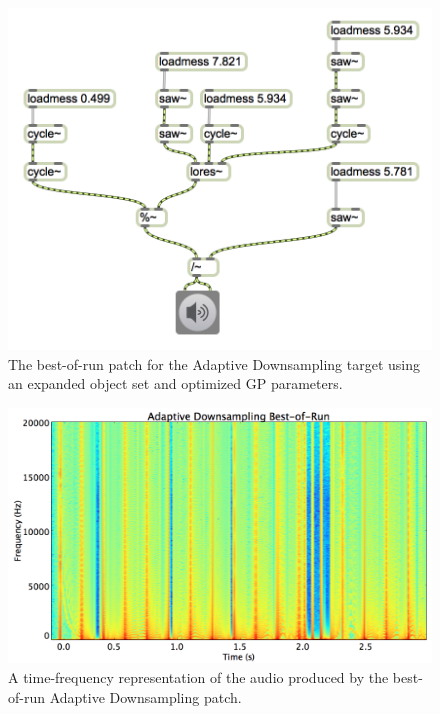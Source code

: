\documentclass[12pt]{report} 	%
\numberwithin{figure}{chapter}
\numberwithin{table}{chapter}
\numberwithin{equation}{chapter}
\begin{document}
\begin{flushleft}
\begin{figure}[h!]
\begin{center}
\includegraphics[width=\linewidth]{AdaptiveDownsample_Best}
\caption[Adaptive downsampling best-of-run patch]{The best-of-run patch for the Adaptive Downsampling target using an expanded object set and optimized GP parameters.}
\end{center}
\end{figure}
\begin{figure}[h!]
\begin{center}
\includegraphics[scale=0.35,width=\linewidth]{AdaptiveDownsamplingBestOfRunSTFT}
\caption[Best-of-run adaptive downsampling time-frequency representation]{A time-frequency representation of the audio produced by the best-of-run Adaptive Downsampling patch.}
\end{center}

\end{figure}
\end{flushleft}
\end{document}
